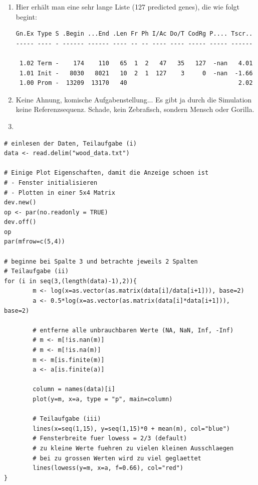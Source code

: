 \documentclass{homework}
\begin{document}
\begin{enumerate}
\begin{enumerate}
\item 
Hier erhält man eine sehr lange Liste (127 predicted genes), die wie folgt begint:
\begin{verbatim}
Gn.Ex Type S .Begin ...End .Len Fr Ph I/Ac Do/T CodRg P.... Tscr..
----- ---- - ------ ------ ---- -- -- ---- ---- ----- ----- ------

 1.02 Term -    174    110   65  1  2   47   35   127  -nan   4.01
 1.01 Init -   8030   8021   10  2  1  127    3     0  -nan  -1.66
 1.00 Prom -  13209  13170   40                               2.02
\end{verbatim}
\item 
Keine Ahnung, komische Aufgabenstellung... Es gibt ja durch die Simulation keine Referenzsequenz.
Schade, kein Zebrafisch, sondern Mensch oder Gorilla.
\item 
\end{enumerate}


\begin{verbatim}
# einlesen der Daten, Teilaufgabe (i)
data <- read.delim("wood_data.txt")

# Einige Plot Eigenschaften, damit die Anzeige schoen ist
# - Fenster initialisieren
# - Plotten in einer 5x4 Matrix
dev.new()
op <- par(no.readonly = TRUE)
dev.off()
op
par(mfrow=c(5,4))

# beginne bei Spalte 3 und betrachte jeweils 2 Spalten
# Teilaufgabe (ii)
for (i in seq(3,(length(data)-1),2)){
		m <- log(x=as.vector(as.matrix(data[i]/data[i+1])), base=2)
		a <- 0.5*log(x=as.vector(as.matrix(data[i]*data[i+1])), base=2)
	
		# entferne alle unbrauchbaren Werte (NA, NaN, Inf, -Inf)
		# m <- m[!is.nan(m)]
		# m <- m[!is.na(m)]
		m <- m[is.finite(m)]
		a <- a[is.finite(a)]
		
		column = names(data)[i]				
		plot(y=m, x=a, type = "p", main=column)	

        # Teilaufgabe (iii)
		lines(x=seq(1,15), y=seq(1,15)*0 + mean(m), col="blue")
		# Fensterbreite fuer lowess = 2/3 (default)
		# zu kleine Werte fuehren zu vielen kleinen Ausschlaegen
		# bei zu grossen Werten wird zu viel geglaettet
		lines(lowess(y=m, x=a, f=0.66), col="red")
}
\end{verbatim}


\end{enumerate}
\end{document}
